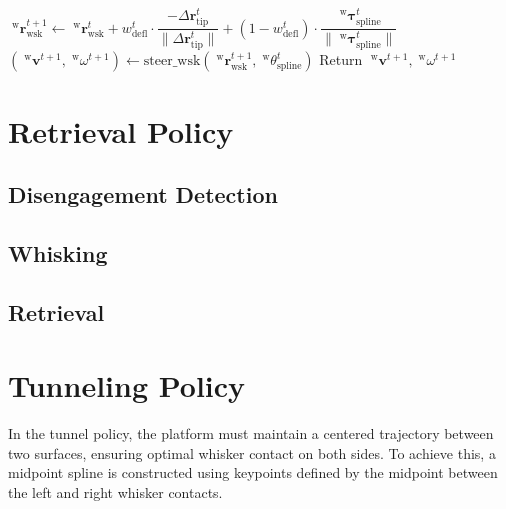 \begin{algorithm}[htb]
\begin{algorithmic}
        \State \(\;^{\mathrm{w}}\boldsymbol{r}_{\mathrm{wsk}}^{t+1} \gets \;^{\mathrm{w}}\boldsymbol{r}_{\mathrm{wsk}}^{t} + w_{\mathrm{defl}}^{t} \cdot \dfrac{-\Delta\boldsymbol{r}_{\mathrm{tip}}^{t}}{\|\Delta\boldsymbol{r}_{\mathrm{tip}}^{t}\|} + (1 - w_{\mathrm{defl}}^{t}) \cdot \dfrac{\;^{\mathrm{w}}\boldsymbol{\tau}_{\mathrm{spline}}^{t}}{\|\;^{\mathrm{w}}\boldsymbol{\tau}_{\mathrm{spline}}^{t}\|}\) 
        \State
        \State
        \State \((\;^{\mathrm{w}}\boldsymbol{v}^{t+1}, \;^{\mathrm{w}}\omega^{t+1}) \gets \mathrm{steer\_wsk}(\;^{\mathrm{w}}\boldsymbol{r}_{\mathrm{wsk}}^{t+1},\;^{\mathrm{w}}\theta_{\mathrm{spline}}^{t})\)
        \State Return \(\;^{\mathrm{w}}\boldsymbol{v}^{t+1}, \;^{\mathrm{w}}\omega^{t+1}\)
    \end{algorithmic}
    \label{alg:swiping_policy}
\end{algorithm}


\section{Retrieval Policy}

\subsection{Disengagement Detection}

\subsection{Whisking}

\subsection{Retrieval}


\section{Tunneling Policy}

In the tunnel policy, the platform must maintain a centered trajectory between two surfaces, ensuring optimal whisker contact on both sides.
To achieve this, a midpoint spline is constructed using keypoints defined by the midpoint between the left and right whisker contacts.

